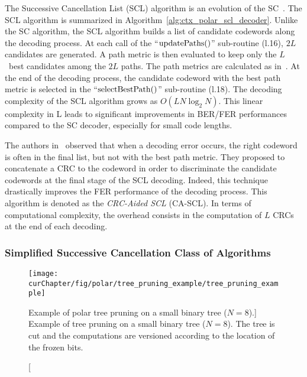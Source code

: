 The Successive Cancellation List (SCL) algorithm is an evolution of the
SC~\cite{Tal2011}. The SCL algorithm is summarized in
Algorithm~\ref{alg:ctx_polar_scl_decoder}. Unlike the SC algorithm, the SCL
algorithm builds a list of candidate codewords along the decoding process. At
each call of the ``$\operatorname*{updatePaths}()$'' sub-routine (l.16), $2L$ candidates are
generated. A path metric is then evaluated to keep only the $L$~best candidates
among the $2L$ paths. The path metrics are calculated as
in~\cite{Balatsoukas-Stimming2015}. At the end of the decoding process, the
candidate codeword with the best path metric is selected in the
``$\operatorname*{selectBestPath}()$'' sub-routine (l.18). The decoding complexity of the
SCL algorithm grows as $O(LN\log_2N)$. This linear complexity in L leads to
significant improvements in BER/FER performances compared to the SC decoder,
especially for small code lengths.


The authors in~\cite{Tal2011} observed that when a decoding error occurs, the
right codeword is often in the final list, but not with the best path metric.
They proposed to concatenate a CRC to the codeword in order to discriminate the
candidate codewords at the final stage of the SCL decoding. Indeed, this
technique drastically improves the FER performance of the decoding process. This
algorithm is denoted as the \emph{CRC-Aided SCL} (CA-SCL). In terms of
computational complexity, the overhead consists in the computation of $L$ CRCs
at the end of each decoding.

\subsubsection{Simplified Successive Cancellation Class of Algorithms}
\label{sec:ctx_polar_simplified_decoders}

\begin{figure}[htp]
  \centering
  \texttt{[image: \\curChapter/fig/polar/tree\_pruning\_example/tree\_pruning\_example]}
  \caption
    [Example of polar tree pruning on a small binary tree ($N = 8$).]
    {Example of tree pruning on a small binary tree ($N = 8$). The tree is cut
    and the computations are versioned according to the location of the frozen
    bits.}
  \label{fig:ctx_polar_tree_pruning_example}
\end{figure}

